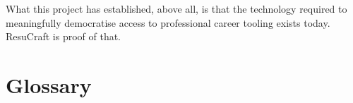 \documentclass[12pt, a4paper, oneside]{report}
\begin{document}
What this project has established, above all, is that the technology required to meaningfully democratise access to professional career tooling exists today. ResuCraft is proof of that.

\newpage


\newpage
\appendix
\chapter{Glossary}
\end{document}
